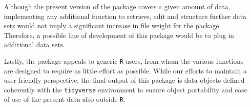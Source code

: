 \documentclass[openany, 11pt, oneside]{book}
\begin{document}
Although the present version of the package covers a given amount of data, implementing any additional function to retrieve, edit and structure further data sets would not imply a significant increase in file weight for the package. Therefore, a possible line of development of this package would be to plug in additional data sets.

Lastly, the package appeals to generic \texttt{R} users, from whom the various functions are designed to require as little effort as possible. While our efforts to maintain a user-friendly perspective, the final output of this package is data objects defined coherently with the \texttt{tidyverse} environment to ensure object portability and ease of use of the present data also outside \texttt{R}.



\newpage
\end{document}
